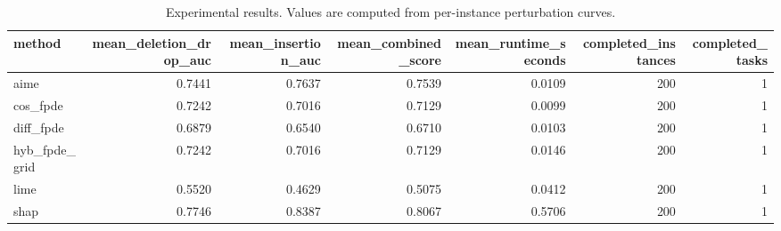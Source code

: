 \begin{table}[t]
\caption{Experimental results. Values are computed from per-instance perturbation curves.}
\label{tab:main_results_computed}
\centering
\begin{tabular}{lrrrrrr}
\toprule
method & mean\_deletion\_drop\_auc & mean\_insertion\_auc & mean\_combined\_score & mean\_runtime\_seconds & completed\_instances & completed\_tasks \\
\midrule
aime & 0.7441 & 0.7637 & 0.7539 & 0.0109 & 200 & 1 \\
cos\_fpde & 0.7242 & 0.7016 & 0.7129 & 0.0099 & 200 & 1 \\
diff\_fpde & 0.6879 & 0.6540 & 0.6710 & 0.0103 & 200 & 1 \\
hyb\_fpde\_grid & 0.7242 & 0.7016 & 0.7129 & 0.0146 & 200 & 1 \\
lime & 0.5520 & 0.4629 & 0.5075 & 0.0412 & 200 & 1 \\
shap & 0.7746 & 0.8387 & 0.8067 & 0.5706 & 200 & 1 \\
\bottomrule
\end{tabular}

\end{table}

